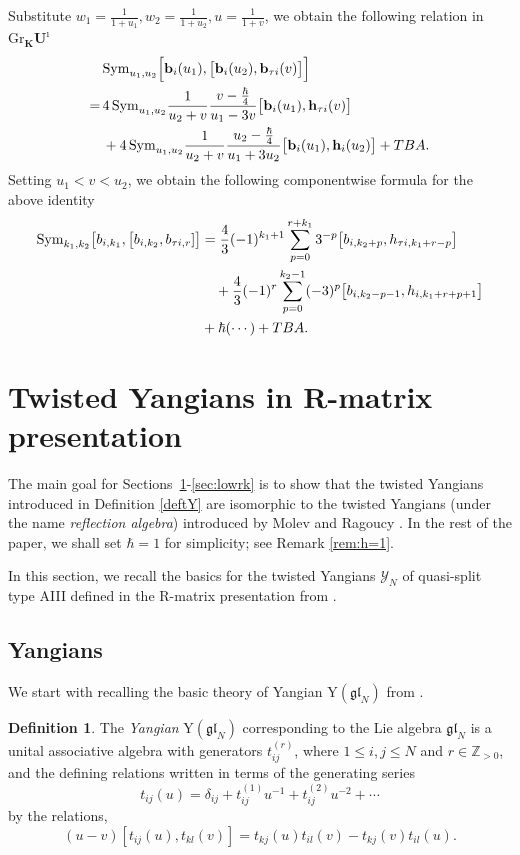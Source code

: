 \documentclass[11pt,reqno]{amsart}
\numberwithin{equation}{section}
\theoremstyle{definition}
\newtheorem{dfn}[thm]{Definition}
\theoremstyle{remark}
\newcommand{\beq}{\begin{equation}}
\newcommand{\eeq}{\end{equation}}
\newcommand{\bZ}{\mathbb{Z}}
\newcommand{\gl}{\mathfrak{gl}}
\newcommand{\rY}{\mathrm{Y}}
\newcommand{\lle}{\leqslant}
\newcommand{\Sym}{{\mathrm{Sym}}}
\newcommand{\Y}{{\mathscr{Y}}}
\def \bh{\mathbf{h}}
\def \bb{\mathbf{b}}
\def \h{\hbar}
\def \H{h}
\def \X{b}
\def \Gr{\mathrm{Gr}}
\def \Sym{\mathrm{Sym}}
\def \tUi{\mathbf{U}^\imath}
\begin{document}
Substitute $w_1=\frac{1}{1+u_1},w_2=\frac{1}{1+u_2},u=\frac{1}{1+v}$, we obtain the following relation in $\Gr_{\mathbf{K}}\tUi$
\begin{align}\notag
&\Sym_{u_1,u_2}\Big[ \bb_{i}(u_1),\big[\bb_{i}(u_2),\bb_{\tau i}(v)\big] \Big]
\\\notag
=\, &4\,\Sym_{u_1,u_2} \frac{1}{u_2+v}\frac{v-\frac{\h}{4}}{u_1-3v} 
\big[\bb_i(u_1),\bh_{\tau i}(v)\big]
\\\notag
&+4\,\Sym_{u_1,u_2} \frac{1}{u_2+v}\frac{u_2-\frac{\h}{4}}{u_1+3u_2}\big[\bb_i(u_1),\bh_{i}(u_2)\big]+TBA.
\end{align}
Setting $u_1<v<u_2$, we obtain the following componentwise formula for the above identity
\begin{align}\notag
\mathrm{Sym}_{k_1,k_2}\big[\X_{i,k_1},\big[\X_{i,k_2},\X_{\tau i,r}]\big]&=\frac{4}{3} (-1)^{k_1+1}\sum_{p=0}^{r+k_1}3^{-p}\big[\X_{i,k_2+p},  \H_{\tau i,k_1+r-p}\big]
\\\notag
&\quad+\frac{4}{3}(-1)^{r}\sum_{p=0}^{k_2-1}(-3)^{p}\big[\X_{i,k_2-p-1},  \H_{i,k_1+r+p+1}\big] 
\\
&+\h(\cdots)+TBA.%
\end{align}

\fi

\section{Twisted Yangians in R-matrix presentation}\label{sec:R}
The main goal for Sections~\ref{sec:R}-\ref{sec:lowrk} is to show that the twisted Yangians introduced in Definition \ref{deftY} are isomorphic to the twisted Yangians (under the name \textit{reflection algebra}) introduced by Molev and Ragoucy \cite{MR02}. In the rest of the paper, we shall set $\h=1$ for simplicity; see Remark \ref{rem:h=1}. 

In this section, we recall the basics for the twisted Yangians $\Y_N$ of quasi-split type AIII defined in the R-matrix presentation from \cite{MR02}.

\subsection{Yangians}
\label{subsec:Y}
We start with recalling the basic theory of Yangian $\rY(\gl_N)$ from \cite{MNO96,Mol07}.
\begin{dfn}
The \textit{Yangian} $\rY(\gl_N)$ corresponding to the Lie algebra $\gl_N$ is a unital associative algebra with generators $t_{ij}^{(r)}$, where $1\lle i,j\lle N$ and $r\in\bZ_{>0}$, and the defining relations written in terms of the generating series
\[
t_{ij}(u)=  \delta_{ij}+t_{ij}^{(1)}u^{-1}+t_{ij}^{(2)}u^{-2}+\cdots
\]
by the relations,
\beq\label{Trel}
(u-v)[t_{ij}(u),t_{kl}(v)]=t_{kj}(u)t_{il}(v)-t_{kj}(v)t_{il}(u).
\eeq
\end{dfn}
\end{document}
